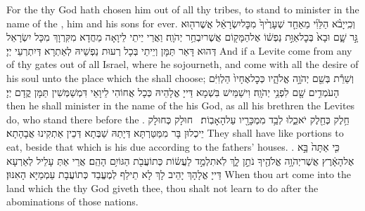 {For the \lord\space thy God hath chosen him out of all thy tribes, to stand to minister in the name of the \lord, him and his sons for ever.}{}
{וְכִֽי\maqqaf יָבֹ֨א הַלֵּוִ֜י מֵאַחַ֤ד שְׁעָרֶ֙יךָ֙ מִכׇּל\maqqaf יִשְׂרָאֵ֔ל אֲשֶׁר\maqqaf ה֖וּא גָּ֣ר שָׁ֑ם וּבָא֙ בְּכׇל\maqqaf אַוַּ֣ת נַפְשׁ֔וֹ אֶל\maqqaf הַמָּק֖וֹם אֲשֶׁר\maqqaf יִבְחַ֥ר יְהֹוָֽה׃}
{וַאֲרֵי יֵיתֵי לֵיוָאָה מֵחֲדָא מִקִּרְוָךְ מִכָּל יִשְׂרָאֵל דְּהוּא דָּאַר תַּמָּן וְיֵיתֵי בְּכָל רְעוּת נַפְשֵׁיהּ לְאַתְרָא דְּיִתְרְעֵי יְיָ׃}
{And if a Levite come from any of thy gates out of all Israel, where he sojourneth, and come with all the desire of his soul unto the place which the \lord\space shall choose;}{}
{וְשֵׁרֵ֕ת בְּשֵׁ֖ם יְהֹוָ֣ה אֱלֹהָ֑יו כְּכׇל\maqqaf אֶחָיו֙ הַלְוִיִּ֔ם הָעֹמְדִ֥ים שָׁ֖ם לִפְנֵ֥י יְהֹוָֽה׃}
{וִישַׁמֵּישׁ בִּשְׁמָא דַּייָ אֱלָהֵיהּ כְּכָל אֲחוֹהִי לֵיוָאֵי דִּמְשַׁמְּשִׁין תַּמָּן קֳדָם יְיָ׃}
{then he shall minister in the name of the \lord\space his God, as all his brethren the Levites do, who stand there before the \lord.}{}
{חֵ֥לֶק כְּחֵ֖לֶק יֹאכֵ֑לוּ לְבַ֥ד מִמְכָּרָ֖יו עַל\maqqaf הָאָבֽוֹת׃ \setuma }
{חוּלָק כְּחוּלָק יֵיכְלוּן בָּר מִמַּטַּרְתָּא דְּיָתַהּ שַׁבְּתָא דְּכֵין אַתְקִינוּ אֲבָהָתָא׃}
{They shall have like portions to eat, beside that which is his due according to the fathers’ houses. .}{}
{כִּ֤י אַתָּה֙ בָּ֣א אֶל\maqqaf הָאָ֔רֶץ אֲשֶׁר\maqqaf יְהֹוָ֥ה אֱלֹהֶ֖יךָ נֹתֵ֣ן לָ֑ךְ לֹֽא\maqqaf תִלְמַ֣ד לַעֲשׂ֔וֹת כְּתוֹעֲבֹ֖ת הַגּוֹיִ֥ם הָהֵֽם׃}
{אֲרֵי אַתְּ עָלֵיל לְאַרְעָא דַּייָ אֱלָהָךְ יָהֵיב לָךְ לָא תֵילַף לְמֶעֱבַד כְּתוֹעֲבָת עַמְמַיָּא הָאִנּוּן׃}
{When thou art come into the land which the \lord\space thy God giveth thee, thou shalt not learn to do after the abominations of those nations.}{}
